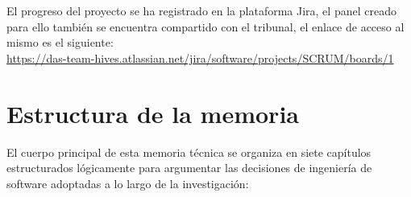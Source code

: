 El progreso del proyecto se ha registrado en la plataforma Jira, el panel creado para ello también se encuentra compartido con el tribunal, el enlace de acceso al mismo es el siguiente: \\
\url{https://das-team-hives.atlassian.net/jira/software/projects/SCRUM/boards/1}\\

\section{Estructura de la memoria}

El cuerpo principal de esta memoria técnica se organiza en siete capítulos estructurados lógicamente para argumentar las decisiones de ingeniería de software adoptadas a lo largo de la investigación:

